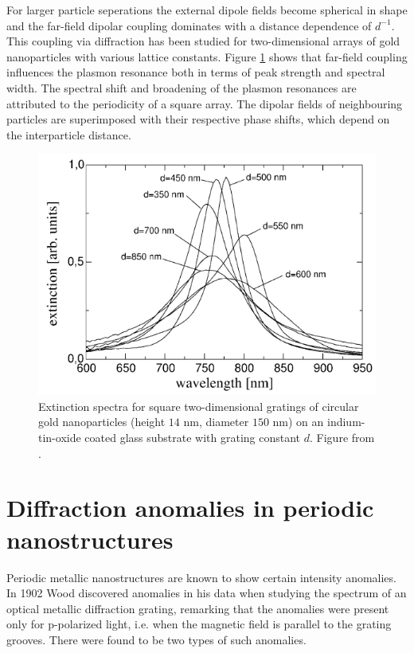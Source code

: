 For larger particle seperations the external dipole fields become spherical in shape and the far-field dipolar coupling dominates with a distance dependence of $d^{-1}$\cite{maier}. This coupling via diffraction has been studied for two-dimensional arrays of gold nanoparticles with various lattice constants\cite{Lamprecht_LSPRfarfieldcoupling}. Figure \ref{fig:nearfield_coupling} shows that far-field coupling influences the plasmon resonance both in terms of peak strength and spectral width. The spectral shift and broadening of the plasmon resonances are attributed to the periodicity of a square array. The dipolar fields of neighbouring particles are superimposed with their respective phase shifts, which depend on the interparticle distance\cite{Lamprecht_LSPRfarfieldcoupling}.


\begin{figure}
    \centering
    \includegraphics[width=0.5\linewidth]{figures/Ch2/farfieldcoupling.png}
    \caption{Extinction spectra for square two-dimensional gratings of circular gold nanoparticles (height $14$ nm, diameter $150$ nm) on an indium-tin-oxide coated glass substrate with grating constant $d$. Figure from \cite{Lamprecht_LSPRfarfieldcoupling}.}
    \label{fig:nearfield_coupling}
\end{figure}

\section{Diffraction anomalies in periodic nanostructures}
Periodic metallic nanostructures are known to show certain intensity anomalies. In 1902 Wood discovered anomalies in his data when studying the spectrum of an optical metallic diffraction grating, remarking that the anomalies were present only for p-polarized light, i.e. when the magnetic field is parallel to the grating grooves\cite{Wood1902}. There were found to be two types of such anomalies. 

